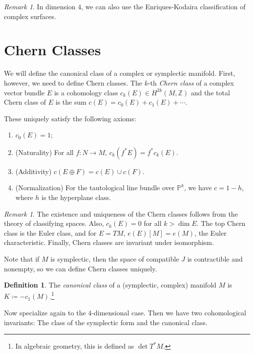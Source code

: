 \documentclass[leqno, openany]{memoir}
\theoremstyle{definition}
\newtheorem{defn}[thm]{Definition}
\theoremstyle{remark}
\newtheorem{rmk}[thm]{Remark}
\theoremstyle{plain}
\theoremstyle{definition}
\theoremstyle{remark}
\newcommand{\Z}{\mathbb{Z}}
\renewcommand{\P}{\mathbb{P}}
\begin{document}
\begin{rmk}
    In dimension $4$, we can also use the Enriques-Kodaira classification of complex surfaces.
\end{rmk}

\section{Chern Classes}%
\label{sec:chern_classes}

We will define the canonical class of a complex or symplectic manifold. First, however, we need to define Chern classes. The $k$-th \textit{Chern class} of a complex vector bundle $E$ is a cohomology class $c_k(E) \in H^{2k}(M, \Z)$ and the total Chern class of $E$ is the sum $c(E) = c_0(E) + c_1(E) + \cdots$.

These uniquely satisfy the following axioms:
\begin{enumerate}
    \item $c_0(E) = 1$;
    \item (Naturality) For all $f:N \to M$, $c_k(f^*E) = f^*c_k(E)$.
    \item (Additivity) $c(E \oplus F) = c(E) \cup c(F)$.
    \item (Normalization) For the tautological line bundle over $\P^k$, we have $c = 1 - h$, where $h$ is the hyperplane class.
\end{enumerate}

\begin{rmk}
    The existence and uniqueness of the Chern classes follows from the theory of classifying spaces. Also, $c_k(E) = 0$ for all $k > \dim E$. The top Chern class is the Euler class, and for $E = TM$, $e(E)[M] = e(M)$, the Euler characteristic. Finally, Chern classes are invariant under isomorphism.
\end{rmk}

Note that if $M$ is symplectic, then the space of compatible $J$ is contractible and nonempty, so we can define Chern classes uniquely.

\begin{defn}
    The \textit{canonical class} of a (symplectic, complex) manifold $M$ is $K \coloneqq - c_1(M)$.\footnote{In algebraic geometry, this is defined as $\det T^*M$.}
\end{defn}

Now specialize again to the $4$-dimensional case. Then we have two cohomological invariants: The class of the symplectic form and the canonical class.
\end{document}
